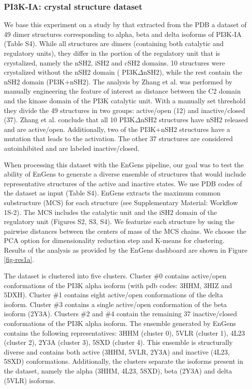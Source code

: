\documentclass[numsec,webpdf,contemporary,large]{oup-authoring-template}
\theoremstyle{thmstyleone}%
\theoremstyle{thmstyletwo}%
\theoremstyle{thmstylethree}%
\begin{document}
\subsubsection{PI3K-IA: crystal structure dataset}

We base this experiment on a study by \cite{zhang_structural_2020} that extracted from the PDB a dataset of 49 dimer structures corresponding to alpha, beta and delta isoforms of PI3K-IA (Table S4). While all structures are dimers (containing both catalytic and regulatory units), they differ in the portion of the regulatory unit that is crystalized, namely the nSH2, iSH2 and cSH2 domains. 10 structures were crystalized without the nSH2 domain ( PI3K$\Delta$nSH2), while the rest contain the nSH2 domain (PI3K+nSH2). The analysis by Zhang et al. was performed by manually engineering the feature of interest as distance between the C2 domain and the kinase domain of the PI3K catalytic unit. With a manually set threshold they divide the 49 structures in two groups: active/open (12) and inactive/closed (37). Zhang et al. conclude that all 10 PI3K$\Delta$nSH2 structures have nSH2 released and are active/open. Additionally, two of the PI3K+nSH2 structures have a mutation that leads to the activation. The other 37 structures are considered autoinhibited and are labeled inactive/closed.

When processing this dataset with the EnGens pipeline, our goal was to test the ability of EnGens to generate a diverse ensemble of structures that would include representative structures of the active and inactive states. We use PDB codes of the dataset as input (Table S4). EnGens extracts the maximum common substructure (MCS) for each structure (see Supplementary Material: Workflow 1S-2). The MCS includes the catalytic unit and the iSH2 domain of the regulatory unit (Figures S2, S3, S4). We featurize each structure by using the pairwise distances between the centers of mass of the MCS chains. We choose the PCA option for dimensionality reduction step and K-means for clustering. Results of the analysis as provided by the EnGens dashboard are shown in Figure \ref{fig-res1a}. 

The dataset is clustered into five clusters. Cluster \#0 contains active/open conformations of the PI3K alpha isoform (with pdb codes: 3HHM, 3HIZ and 5DXH). Cluster \#1 contains eight active/open conformations of the delta isoform. Cluster \#3 contains a single active/open conformation of the beta isoform (2Y3A). Clusters \#2 and \#4 contain the remaining 37 inactive/closed conformations of the PI3K alpha isoform. The ensemble generated by EnGens contains the following representatives: 3HHM (cluster 0), 5VLR (cluster 1), 4L23 (cluster 2), 2Y3A (cluster 3),  5SXD (cluster 4). This ensemble is structurally diverse and contains both active (3HHM, 5VLR, 2Y3A) and inactive (4L23, 5SXD) conformations. Additionally, the clusters separate the isoforms present in the dataset, namely the alpha (3HHM, 4L23, 5SXD), beta (2Y3A) and delta (5VLR) isoforms. 
\end{document}
